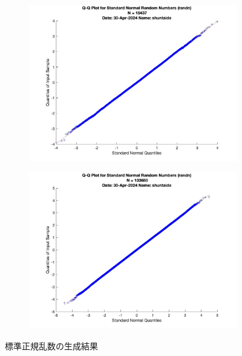 \begin{figure}
\begin{subfigure}{0.48\linewidth}
        \label{fig:standard-normal-qqpl-2511}
    \end{subfigure}
    \begin{subfigure}{0.48\linewidth}
        \centering
        \includegraphics[width=0.8\linewidth]{src/figures/standard-normal/randn_qqpl_N=15437.jpg}
        \label{fig:standard-normal-qqpl-15437}
    \end{subfigure}
    \begin{subfigure}{0.48\linewidth}
        \centering
        \includegraphics[width=0.8\linewidth]{src/figures/standard-normal/randn_qqpl_N=133680.jpg}
        \label{fig:standard-normal-qqpl-133680}
    \end{subfigure}
    \caption{標準正規乱数の生成結果}\label{fig:standard-normal-random}
\end{figure}
